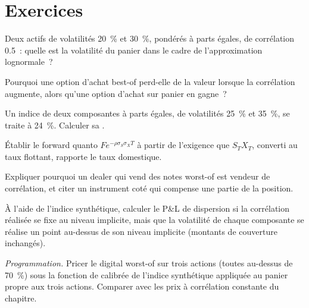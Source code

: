 \section{Exercices}

\begin{exercise}[$\star$]\label{exo:dv:multi-asset-options:1}
Deux actifs de volatilités 20~\% et 30~\%, pondérés à parts égales, de corrélation 0.5~: quelle est la volatilité du panier dans le cadre de l'approximation
lognormale~?
\end{exercise}

\begin{exercise}[$\star$]\label{exo:dv:multi-asset-options:2}
Pourquoi une option d'achat best-of perd-elle de la valeur lorsque la corrélation augmente, alors qu'une option d'achat sur panier en gagne~?
\end{exercise}

\begin{exercise}[$\star$]\label{exo:dv:multi-asset-options:3}
Un indice de deux composantes à parts égales, de volatilités 25~\% et 35~\%, se traite à 24~\%. Calculer sa .
\end{exercise}

\begin{exercise}[$\star\star$]\label{exo:dv:multi-asset-options:4}
Établir le forward quanto $Fe^{-\rho\sigma_S\sigma_XT}$ à partir de l'exigence que $S_TX_T$, converti au taux flottant,
rapporte le taux domestique.
\end{exercise}

\begin{exercise}[$\star\star$]\label{exo:dv:multi-asset-options:5}
Expliquer pourquoi un dealer qui vend des notes worst-of est vendeur de corrélation, et citer un instrument coté qui compense une partie de la
position.
\end{exercise}

\begin{exercise}[$\star\star$]\label{exo:dv:multi-asset-options:6}
À l'aide de l'indice synthétique, calculer le P\&L de dispersion si la corrélation réalisée se fixe au niveau implicite, mais que la
volatilité de chaque composante se réalise un point au-dessus de son niveau implicite (montants de couverture inchangés).
\end{exercise}

\begin{exercise}[$\star\star\star$]\label{exo:dv:multi-asset-options:7}
\emph{Programmation.} Pricer le digital worst-of sur trois actions (toutes au-dessus de 70~\%) sous la fonction de  calibrée de l'indice synthétique
appliquée au panier propre aux trois actions. Comparer avec les prix à corrélation constante du chapitre.
\end{exercise}

